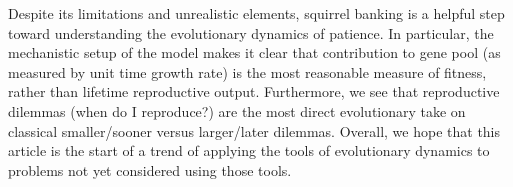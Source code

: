 \documentclass[titlepage, hidelinks, 12pt]{article}
\theoremstyle{plain}
\theoremstyle{remark}
\theoremstyle{definition}
\begin{document}
Despite its limitations and unrealistic elements, squirrel banking is a helpful step toward understanding the evolutionary dynamics of patience. 
In particular, the mechanistic setup of the model makes it clear that contribution to gene pool (as measured by unit time growth rate) is the most
reasonable measure of fitness, rather than lifetime reproductive output. Furthermore, we see that reproductive dilemmas (when do I reproduce?) 
are the most direct evolutionary take on classical smaller/sooner versus larger/later dilemmas. Overall, we hope that this article is the start
of a trend of applying the tools of evolutionary dynamics to problems not yet considered using those tools. 



\newpage

{}
\end{document}
